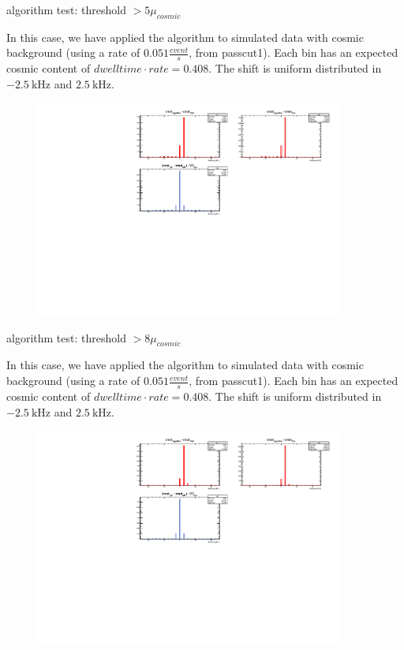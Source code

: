 \documentclass[8pt]{beamer}
\begin{document}
\begin{frame}{algorithm test: threshold $ > 5 \mu_{cosmic}$}

In this case, we have applied the algorithm to simulated data with cosmic background (using a rate of $0.051 \frac{event}{s}$, from passcut1). Each bin has an expected cosmic content of $dwelltime \cdot rate = 0.408$.
The shift is uniform distributed in $\SI{-2.5}{\kilo \hertz}$ and $\SI{+2.5}{\kilo \hertz}$. 
\begin{figure}
\includegraphics[width = 0.9\textwidth]{../Plot/OnsetResult12.pdf}
\end{figure}

\end{frame}


\begin{frame}{algorithm test: threshold $ > 8 \mu_{cosmic}$}

In this case, we have applied the algorithm to simulated data with cosmic background (using a rate of $0.051 \frac{event}{s}$, from passcut1). Each bin has an expected cosmic content of $dwelltime \cdot rate = 0.408$.
The shift is uniform distributed in $\SI{-2.5}{\kilo \hertz}$ and $\SI{+2.5}{\kilo \hertz}$. 
\begin{figure}
\includegraphics[width = 0.9\textwidth]{../Plot/OnsetResult15.pdf}
\end{figure}

\end{frame}
\end{document}
